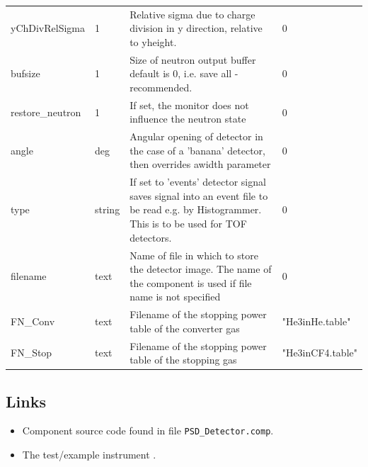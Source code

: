\begin{longtable}{p{}p{}p{}p{}}
yChDivRelSigma & 1 & Relative sigma due to charge division in y direction, relative to yheight. & 0 \\
bufsize & 1 & Size of neutron output buffer default is 0, i.e. save all - recommended. & 0 \\
restore\_neutron & 1 & If set, the monitor does not influence the neutron state & 0 \\
angle & deg & Angular opening of detector in the case of a 'banana' detector, then overrides awidth parameter & 0 \\
type & string & If set to 'events' detector signal saves signal into an event file to be read e.g. by Histogrammer. This is to be used for TOF detectors. & 0 \\
filename & text & Name of file in which to store the detector image. The name of the component is used if file name is not specified & 0 \\
FN\_Conv & text & Filename of the stopping power table of the converter gas & "He3inHe.table" \\
FN\_Stop & text & Filename of the stopping power table of the stopping gas & "He3inCF4.table" \\
\bottomrule
\end{longtable}

\subsection*{Links}
\begin{itemize}
  \item Component source code found in file \texttt{PSD\_Detector.comp}.
  \item The test/example instrument .
\end{itemize}
